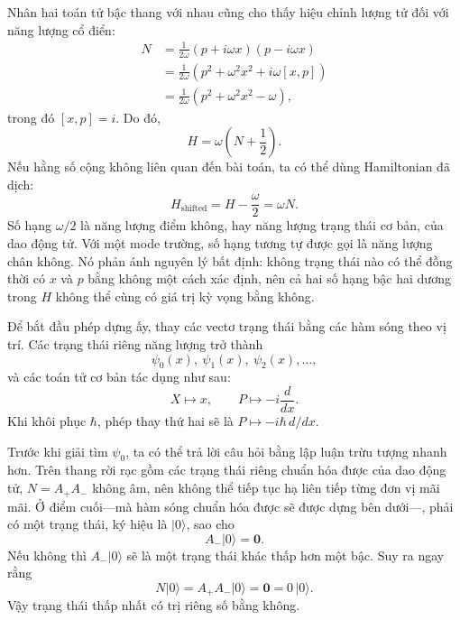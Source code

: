 Nhân hai toán tử bậc thang với nhau cũng cho thấy hiệu chỉnh lượng tử đối với năng lượng cổ điển:
\begin{align}
N
&=\frac{1}{2\omega}(p+i\omega x)(p-i\omega x)\\
&=\frac{1}{2\omega}\left(p^{2}+\omega^{2}x^{2}
 +i\omega[x,p]\right)\\
&=\frac{1}{2\omega}\left(p^{2}+\omega^{2}x^{2}-\omega\right),
\end{align}
trong đó \([x,p]=i\). Do đó,
\begin{equation}
H=\omega\left(N+\frac12\right).
\end{equation}
Nếu hằng số cộng không liên quan đến bài toán, ta có thể dùng Hamiltonian đã dịch:
\begin{equation}
H_{\mathrm{shifted}}=H-\frac{\omega}{2}=\omega N.
\end{equation}
Số hạng \(\omega/2\) là năng lượng điểm không, hay năng lượng trạng thái cơ bản, của dao động tử. Với một mode trường, số hạng tương tự được gọi là năng lượng chân không. Nó phản ánh nguyên lý bất định: không trạng thái nào có thể đồng thời có \(x\) và \(p\) bằng không một cách xác định, nên cả hai số hạng bậc hai dương trong \(H\) không thể cùng có giá trị kỳ vọng bằng không.

\begin{classroomqa}
\end{classroomqa}

Để bắt đầu phép dựng ấy, thay các vectơ trạng thái bằng các hàm sóng theo vị trí. Các trạng thái riêng năng lượng trở thành
\[
\psi_{0}(x),\ \psi_{1}(x),\ \psi_{2}(x),\ldots,
\]
và các toán tử cơ bản tác dụng như sau:
\begin{equation}
X\longmapsto x,\qquad
P\longmapsto -i\frac{d}{dx}.
\end{equation}
Khi khôi phục \(\hbar\), phép thay thứ hai sẽ là
\(P\mapsto-i\hbar\,d/dx\).

Trước khi giải tìm \(\psi_{0}\), ta có thể trả lời câu hỏi bằng lập luận trừu tượng nhanh hơn. Trên thang rời rạc gồm các trạng thái riêng chuẩn hóa được của dao động tử, \(N=A_{+}A_{-}\) không âm, nên không thể tiếp tục hạ liên tiếp từng đơn vị mãi mãi. Ở điểm cuối---mà hàm sóng chuẩn hóa được sẽ được dựng bên dưới---, phải có một trạng thái, ký hiệu là \(\lvert0\rangle\), sao cho
\begin{equation}
A_{-}\lvert0\rangle=\mathbf 0.
\end{equation}
Nếu không thì \(A_{-}\lvert0\rangle\) sẽ là một trạng thái khác thấp hơn một bậc. Suy ra ngay rằng
\begin{equation}
N\lvert0\rangle
=A_{+}A_{-}\lvert0\rangle
=\mathbf 0
=0\,\lvert0\rangle.
\end{equation}
Vậy trạng thái thấp nhất có trị riêng số bằng không.


